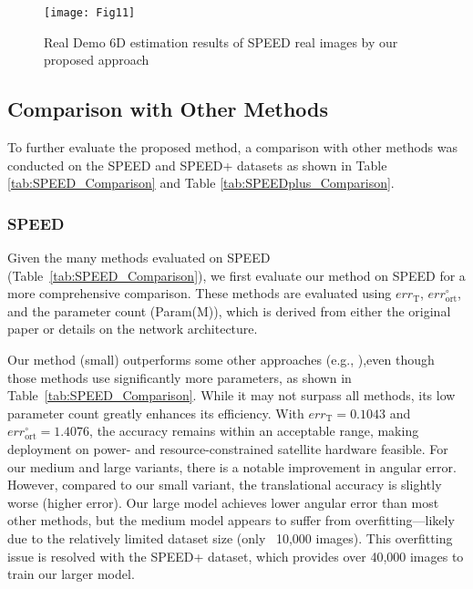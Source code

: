\documentclass[a4paper,fleqn]{cas-sc}
\begin{document}
\begin{figure*}[htbp]
	\centering
	\texttt{[image: Fig11]} 
	\caption{Real Demo 6D estimation results of SPEED real images by our proposed approach}
	\label{fig:realdemo}
\end{figure*}

\subsection{Comparison with Other Methods}
To further evaluate the proposed method, a comparison with other methods was conducted on the SPEED and SPEED+ datasets as shown in Table \ref{tab:SPEED_Comparison} and Table \ref{tab:SPEEDplus_Comparison}.

\subsubsection{SPEED}
Given the many methods evaluated on SPEED (Table~\ref{tab:SPEED_Comparison}), we first evaluate our method on SPEED for a more comprehensive comparison. These methods are evaluated using $err_{\text{T}}$, $err_{\text{ort}}^{\circ}$, and the parameter count (Param(M)), which is derived from either the original paper or details on the network architecture. 

Our method (small) outperforms some other approaches (e.g., \citet{chen2019satellite, piazza2021deep}),even though those methods use significantly more parameters, as shown in Table~\ref{tab:SPEED_Comparison}. While it may not surpass all methods, its low parameter count greatly enhances its efficiency. With $err_{\text{T}} = 0.1043$ and $err_{\text{ort}}^{\circ} = 1.4076$, the accuracy remains within an acceptable range, making deployment on power- and resource-constrained satellite hardware feasible. 
For our medium and large variants, there is a notable improvement in angular error. However, compared to our small variant, the translational accuracy is slightly worse (higher error). Our large model achieves lower angular error than most other methods, but the medium model appears to suffer from overfitting—likely due to the relatively limited dataset size (only ~10,000 images). This overfitting issue is resolved with the SPEED+ dataset, which provides over 40,000 images to train our larger model.
\end{document}
